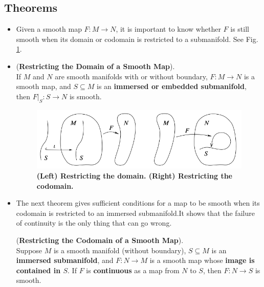 \documentclass[11pt]{article}
\begin{document}
\subsection{Theorems}
\begin{itemize}
\item \begin{remark}
Given a smooth map $F: M \rightarrow N$, it is important to know whether $F$ is still smooth when its domain or codomain is restricted to a submanifold. See Fig. \ref{fig: restricting_domain}.
\end{remark}

\item \begin{theorem} (\textbf{Restricting the Domain of a Smooth Map}). \citep{lee2003introduction}\\
If $M$ and $N$ are smooth manifolds with or without boundary, $F: M \rightarrow N$ is a smooth map, and $S \subseteq M$ is an \textbf{immersed or embedded submanifold}, then $F|_{S}: S \rightarrow N$ is smooth.
\end{theorem}

\begin{figure}
\begin{minipage}[htb]{1\linewidth}
  \centering
  \centerline{\includegraphics[scale = 0.4]{restricting_domain.png}}
\end{minipage}
\caption{\footnotesize{\textbf{(Left) Restricting the domain. (Right) Restricting the codomain.  \citep{lee2003introduction}}}}
\label{fig: restricting_domain}
\end{figure}

\item The next theorem gives sufficient conditions for a map to be smooth when its codomain is restricted to an immersed submanifold.It shows that the failure of continuity is the only thing that can go wrong.
\begin{theorem} (\textbf{Restricting the Codomain of a Smooth Map}). \citep{lee2003introduction}\\ 
Suppose $M$ is a smooth manifold (without boundary), $S \subseteq M$ is an \textbf{immersed submanifold}, and $F: N \rightarrow M$ is a smooth map whose \textbf{image is contained in $S$}. If $F$ is \textbf{continuous} as a map from $N$ to $S$, then $F: N \rightarrow S$ is smooth.
\end{theorem}


\end{itemize}
\end{document}
